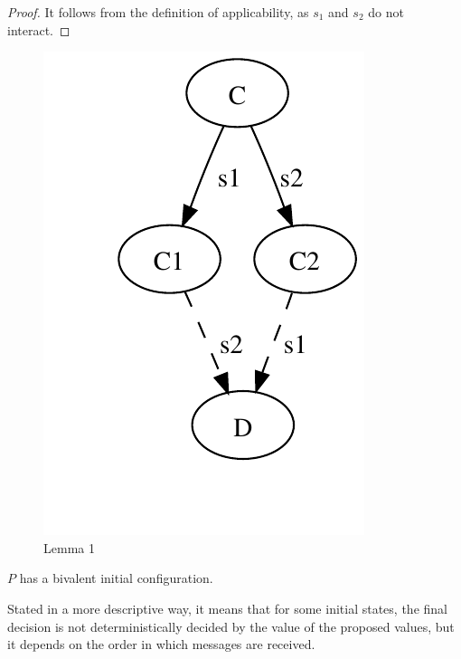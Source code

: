 \documentclass[12pt]{article}
\begin{document}
\begin{proof}
It follows from the definition of applicability, as $s_1$ and $s_2$ do not
interact.
\end{proof}

\begin{figure}
\begin{center}
\includegraphics{figs/06/consensus-fig1.pdf}
\end{center}
\caption{Lemma 1}
\end{figure}


\newpage
\begin{lemma}
$P$ has a bivalent initial configuration. 
\end{lemma}

Stated in a more descriptive way, it means that for some initial
states, the final decision is not deterministically decided by 
the value of the proposed values, but it depends on the order
in which messages are received.
\end{document}
